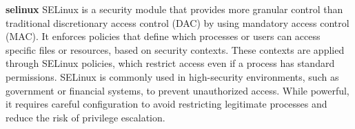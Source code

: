 \textbf{selinux}
SELinux is a security module that provides more granular control than traditional discretionary access control (DAC) by using mandatory access control (MAC). It enforces policies that define which processes or users can access specific files or resources, based on security contexts. These contexts are applied through SELinux policies, which restrict access even if a process has standard permissions. SELinux is commonly used in high-security environments, such as government or financial systems, to prevent unauthorized access. While powerful, it requires careful configuration to avoid restricting legitimate processes and reduce the risk of privilege escalation.